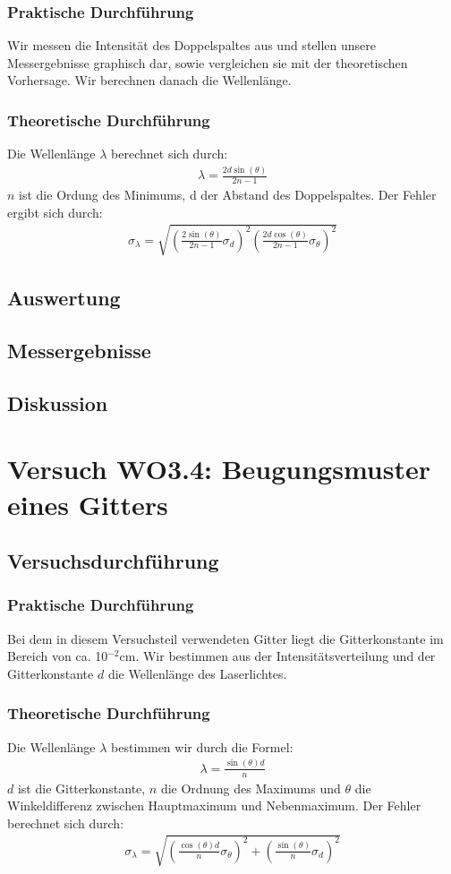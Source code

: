 \documentclass[12pt]{scrartcl}
\begin{document}
\subsubsection{Praktische Durchführung}
Wir messen die Intensität des Doppelspaltes aus und stellen unsere Messergebnisse graphisch dar, sowie vergleichen sie mit der theoretischen Vorhersage. Wir berechnen danach die Wellenlänge.
\subsubsection{Theoretische Durchführung}
Die Wellenlänge $\lambda$ berechnet sich durch:
\begin{align}
\lambda = \frac{2d \sin(\theta)}{2n-1}
\end{align}
$n$ ist die Ordung des Minimums, d der Abstand des Doppelspaltes.
Der Fehler ergibt sich durch:
\begin{align}
\sigma_\lambda = \sqrt{
\left(\frac{2 \sin(\theta)}{2n-1}\sigma_d\right)^2
\left(\frac{2d \cos(\theta)}{2n-1}\sigma_\theta\right)^2}
\end{align}
\subsection{Auswertung}
\subsection{Messergebnisse}
\subsection{Diskussion}

\section{Versuch WO3.4: Beugungsmuster eines Gitters}
\subsection{Versuchsdurchführung}

\subsubsection{Praktische Durchführung}
Bei dem in diesem Versuchsteil verwendeten Gitter liegt die Gitterkonstante im Bereich von ca. 10$^{-2}$cm. Wir bestimmen aus der Intensitätsverteilung und der Gitterkonstante $d$ die Wellenlänge des Laserlichtes.
\subsubsection{Theoretische Durchführung}
Die Wellenlänge $\lambda$ bestimmen wir durch die Formel:
\begin{align}
\lambda = \frac{\sin(\theta) d}{n}
\end{align}
$d$ ist die Gitterkonstante, $n$ die Ordnung des Maximums und $\theta$ die Winkeldifferenz zwischen Hauptmaximum und Nebenmaximum.
Der Fehler berechnet sich durch:
\begin{align}
\sigma_\lambda = \sqrt{
\left(\frac{\cos(\theta) d}{n}\sigma_\theta\right)^2+
\left(\frac{\sin(\theta)}{n}\sigma_d\right)^2}
\end{align} 
\end{document}
